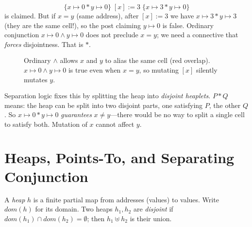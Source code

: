 \begin{example}
\[
\{x\mapsto 0 * y\mapsto 0\}\; [x]:=3\; \{x\mapsto 3 * y\mapsto 0\}
\]
is claimed. But if $x=y$ (same address), after $[x]:=3$ we have $x\mapsto3 * y\mapsto3$ (they are the same cell!), so the post claiming $y\mapsto0$ is false. Ordinary conjunction $x\mapsto0\land y\mapsto0$ does not preclude $x=y$; we need a connective that \emph{forces} disjointness. That is $*$.
\end{example}

\begin{figure}[h]\centering
{}
\caption{Ordinary $\land$ allows $x$ and $y$ to alias the same cell (red overlap). $x\mapsto0\land y\mapsto0$ is true even when $x=y$, so mutating $[x]$ silently mutates $y$.}
\label{fig:alias-land}
\end{figure}

Separation logic fixes this by splitting the heap into \emph{disjoint heaplets}. $P * Q$ means: the heap can be split into two disjoint parts, one satisfying $P$, the other $Q$. So $x\mapsto0 * y\mapsto0$ \emph{guarantees} $x\neq y$—there would be no way to split a single cell to satisfy both. Mutation of $x$ cannot affect $y$.

\section{Heaps, Points-To, and Separating Conjunction}
\label{sec:heaps}
\begin{definition}[Heap]
A \emph{heap} $h$ is a finite partial map from addresses (values) to values. Write $dom(h)$ for its domain. Two heaps $h_1,h_2$ are \emph{disjoint} if $dom(h_1)\cap dom(h_2)=\emptyset$; then $h_1\uplus h_2$ is their union.
\end{definition}

